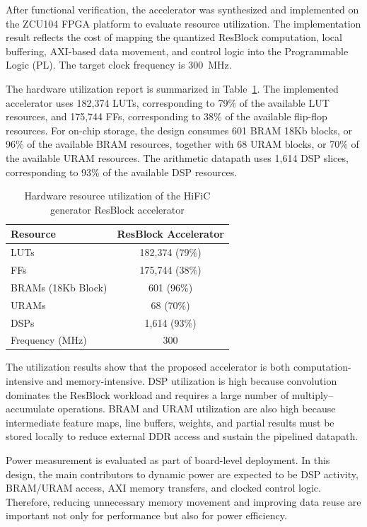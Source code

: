 After functional verification, the accelerator was synthesized and implemented on the ZCU104 FPGA platform to evaluate resource utilization. The implementation result reflects the cost of mapping the quantized ResBlock computation, local buffering, AXI-based data movement, and control logic into the Programmable Logic (PL). The target clock frequency is 300~MHz.

The hardware utilization report is summarized in Table~\ref{tab:hific_generator_utilization}. The implemented accelerator uses 182,374 LUTs, corresponding to 79\% of the available LUT resources, and 175,744 FFs, corresponding to 38\% of the available flip-flop resources. For on-chip storage, the design consumes 601 BRAM 18Kb blocks, or 96\% of the available BRAM resources, together with 68 URAM blocks, or 70\% of the available URAM resources. The arithmetic datapath uses 1,614 DSP slices, corresponding to 93\% of the available DSP resources.

\begin{table}[H]
    \centering
    \caption{Hardware resource utilization of the HiFiC generator ResBlock accelerator}
    \label{tab:hific_generator_utilization}
    \begin{tabular}{|l|c|}
        \hline
        \textbf{Resource} & \textbf{ResBlock Accelerator} \\
        \hline
        LUTs & 182,374 (79\%) \\
        \hline
        FFs & 175,744 (38\%) \\
        \hline
        BRAMs (18Kb Block) & 601 (96\%) \\
        \hline
        URAMs & 68 (70\%) \\
        \hline
        DSPs & 1,614 (93\%) \\
        \hline
        Frequency (MHz) & 300 \\
        \hline
    \end{tabular}
\end{table}

The utilization results show that the proposed accelerator is both computation-intensive and memory-intensive. DSP utilization is high because convolution dominates the ResBlock workload and requires a large number of multiply--accumulate operations. BRAM and URAM utilization are also high because intermediate feature maps, line buffers, weights, and partial results must be stored locally to reduce external DDR access and sustain the pipelined datapath.

Power measurement is evaluated as part of board-level deployment. In this design, the main contributors to dynamic power are expected to be DSP activity, BRAM/URAM access, AXI memory transfers, and clocked control logic. Therefore, reducing unnecessary memory movement and improving data reuse are important not only for performance but also for power efficiency.


